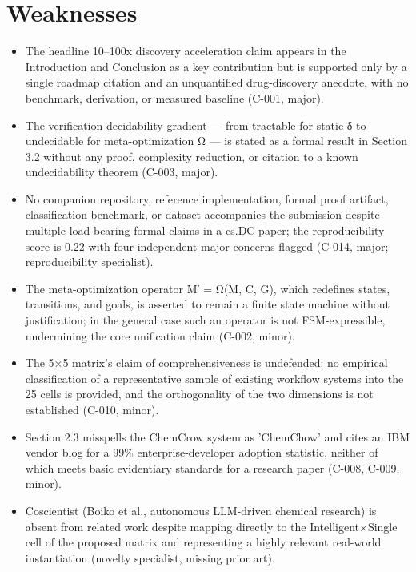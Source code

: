 \documentclass[11pt]{article}
\begin{document}
\section*{Weaknesses}
\begin{itemize}[leftmargin=*]
  \item The headline 10–100x discovery acceleration claim appears in the Introduction and Conclusion as a key contribution but is supported only by a single roadmap citation and an unquantified drug-discovery anecdote, with no benchmark, derivation, or measured baseline (C-001, major).
  \item The verification decidability gradient — from tractable for static δ to undecidable for meta-optimization Ω — is stated as a formal result in Section 3.2 without any proof, complexity reduction, or citation to a known undecidability theorem (C-003, major).
  \item No companion repository, reference implementation, formal proof artifact, classification benchmark, or dataset accompanies the submission despite multiple load-bearing formal claims in a cs.DC paper; the reproducibility score is 0.22 with four independent major concerns flagged (C-014, major; reproducibility specialist).
  \item The meta-optimization operator M′ = Ω(M, C, G), which redefines states, transitions, and goals, is asserted to remain a finite state machine without justification; in the general case such an operator is not FSM-expressible, undermining the core unification claim (C-002, minor).
  \item The 5×5 matrix's claim of comprehensiveness is undefended: no empirical classification of a representative sample of existing workflow systems into the 25 cells is provided, and the orthogonality of the two dimensions is not established (C-010, minor).
  \item Section 2.3 misspells the ChemCrow system as 'ChemChow' and cites an IBM vendor blog for a 99\% enterprise-developer adoption statistic, neither of which meets basic evidentiary standards for a research paper (C-008, C-009, minor).
  \item Coscientist (Boiko et al., autonomous LLM-driven chemical research) is absent from related work despite mapping directly to the Intelligent×Single cell of the proposed matrix and representing a highly relevant real-world instantiation (novelty specialist, missing prior art).
\end{itemize}
\end{document}
